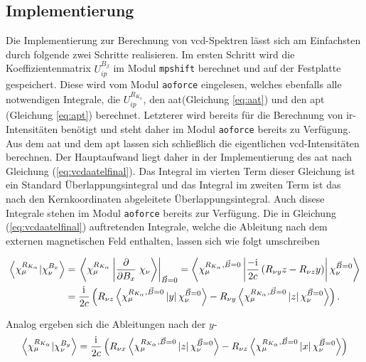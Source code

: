 	\subsection{Implementierung}
Die Implementierung zur Berechnung von \ac{vcd}-Spektren lässt sich am Einfachsten durch folgende zwei Schritte realisieren. Im ersten Schritt wird die Koeffizientenmatrix $U_{ip}^{B_\beta}$ im Modul \texttt{mpshift} berechnet und auf der Festplatte gespeichert. Diese wird vom Modul \texttt{aoforce} eingelesen, welches ebenfalls alle notwendigen Integrale, die $U_{ip}^{R_{K_\alpha}}$, den \ac{aat}(Gleichung \ref{eq:aat}) und den \ac{apt} (Gleichung \ref{eq:apt}) berechnet. Letzterer wird bereits für die Berechnung von \ac{ir}-Intensitäten benötigt und steht daher im Modul \texttt{aoforce} bereits zu Verfügung. Aus dem \ac{aat} und dem \ac{apt} lassen sich schließlich die eigentlichen \ac{vcd}-Intensitäten berechnen. Der Hauptaufwand liegt daher in der Implementierung des \ac{aat} nach Gleichung (\ref{eq:vcdaatelfinal}). Das Integral im vierten Term dieser Gleichung ist ein Standard Überlappungsintegral und das Integral im zweiten Term ist das nach den Kernkoordinaten abgeleitete Überlappungsintegral. Auch disese Integrale stehen im Modul \texttt{aoforce} bereits zur Verfügung.	Die in Gleichung (\ref{eq:vcdaatelfinal}) auftretenden Integrale, welche die Ableitung nach dem externen magnetischen Feld enthalten, lassen sich wie folgt umschreiben

	\begin{equation}\label{eq:ddipx}
	\begin{aligned}
	\left\langle\chi_\mu^{R_{K_\alpha}}\vert\chi_\nu^{B_x}\right\rangle&=\left.\left\langle\chi_\mu^{R_{K_\alpha}}\left|\frac{\partial}{\partial B_x}\right.\chi_\nu\right\rangle\right|_{\vec{B}=0}=\left\langle\chi_\mu^{R_{K_\alpha},\vec{B}=0}\left|\frac{-\mathrm{i}\mkern1mu}{2c}\left(R_{\nu y}z-R_{\nu z}y\right)\right|\chi_\nu^{\vec{B}=0}\right\rangle\\
	  &=\frac{\mathrm{i}\mkern1mu}{2c}\left(R_{\nu z}\left\langle\chi_\mu^{R_{K_\alpha},\vec{B}=0}\left|y\right|\chi_\nu^{\vec{B}=0}\right\rangle-R_{\nu y}\left\langle\chi_\mu^{R_{K_\alpha},\vec{B}=0}\left|z\right|\chi_\nu^{\vec{B}=0}\right\rangle\right).
	  \end{aligned}
	\end{equation}
	
	Analog ergeben sich die Ableitungen nach der $y$-
	\begin{equation}
	\left\langle\chi_\mu^{R_{K_\alpha}}\vert\chi_\nu^{B_y}\right\rangle=\frac{\mathrm{i}\mkern1mu}{2c}\left(R_{\nu x}\left\langle\chi_\mu^{R_{K_\alpha},\vec{B}=0}\left|z\right|\chi_\nu^{\vec{B}=0}\right\rangle-R_{\nu z}\left\langle\chi_\mu^{R_{K_\alpha},\vec{B}=0}\left|x\right|\chi_\nu^{\vec{B}=0}\right\rangle\right)
	\end{equation}
	
